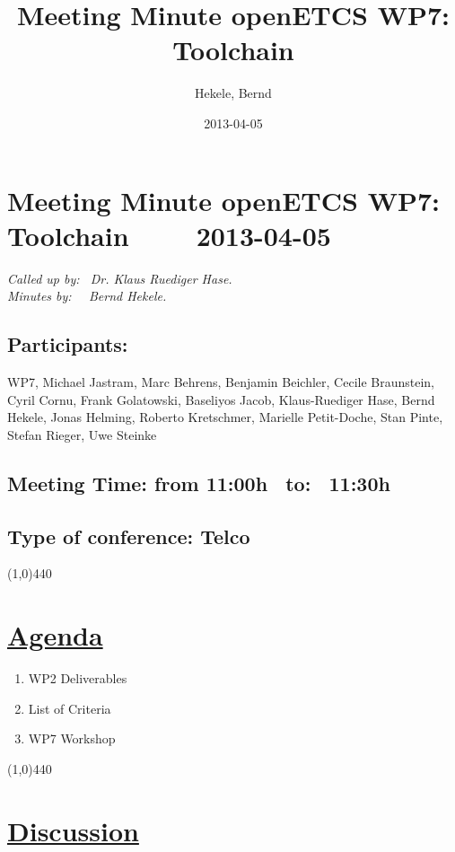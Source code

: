 \documentclass[a4paper]{article}
\title{Meeting Minute openETCS WP7: Toolchain}
\author{Hekele, Bernd}
\date{2013-04-05}
\begin{document}
\section*{\large{Meeting Minute openETCS WP7: Toolchain \ \ \ \ 2013-04-05}}

\emph{Called up by: \ Dr. Klaus Ruediger Hase.}\\
\emph{Minutes by: \ \  Bernd Hekele.}

\subsection*{Participants:} WP7, 
Michael Jastram, 
Marc Behrens, 
Benjamin Beichler,
Cecile Braunstein,
Cyril Cornu,
Frank Golatowski, 
Baseliyos Jacob,
Klaus-Ruediger Hase, 
Bernd Hekele,
Jonas Helming,
Roberto Kretschmer,
Marielle Petit-Doche, 
Stan Pinte, 
Stefan Rieger, 
Uwe Steinke\\


\subsection*{Meeting Time: from 11:00h \ to: \ 11:30h}

\subsection*{Type of conference: Telco}

\line(1,0){440}
\section*{\underline{Agenda}}
\begin{enumerate}
\item WP2 Deliverables
\item List of Criteria
\item WP7 Workshop

\end{enumerate}
\line(1,0){440}
\section*{\underline{Discussion}}
\end{document}
